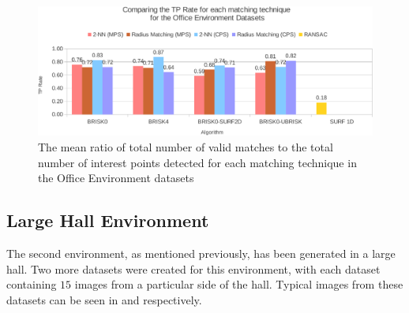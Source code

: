 \documentclass{report}
\begin{document}
%

\begin{figure}
  \centering
    \includegraphics[width=1.0\textwidth]{../Drawings/Graphs/tp_rate_oe.pdf}
    \caption{The mean ratio of total number of valid matches to the total number of interest points detected for each matching technique in the Office Environment datasets} 
    \label{fig:tp_rate_oe}
\end{figure}


\subsection{Large Hall Environment}
\label{sec:largeHall}
The second environment, as mentioned previously, has been generated in a large hall. Two more datasets were created for this environment, with each dataset containing $15$ images from a particular side of the hall. Typical images from these datasets can be seen in  and  respectively.\\ 
\end{document}
